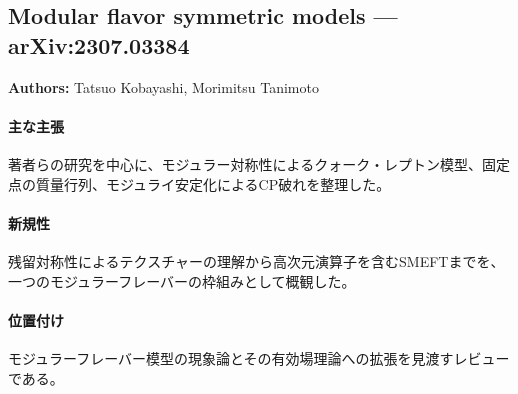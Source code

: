\subsection{Modular flavor symmetric models --- arXiv:2307.03384}

\textbf{Authors:} Tatsuo Kobayashi, Morimitsu Tanimoto

\paragraph{主な主張}
著者らの研究を中心に、モジュラー対称性によるクォーク・レプトン模型、固定点の質量行列、モジュライ安定化によるCP破れを整理した\cite{Kobayashi:2023zzc}。

\paragraph{新規性}
残留対称性によるテクスチャーの理解から高次元演算子を含むSMEFTまでを、一つのモジュラーフレーバーの枠組みとして概観した。

\paragraph{位置付け}
モジュラーフレーバー模型の現象論とその有効場理論への拡張を見渡すレビューである。
